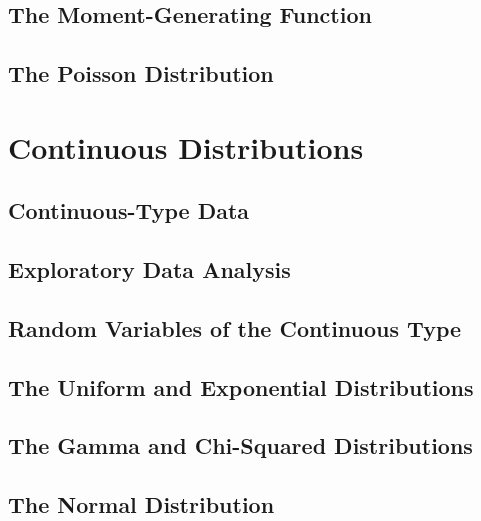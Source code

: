 \documentclass{article}
\begin{document}
\subsection{The Moment-Generating Function}
\subsection{The Poisson Distribution}
\section{Continuous Distributions}
\subsection{Continuous-Type Data}
\subsection{Exploratory Data Analysis}
\subsection{Random Variables of the Continuous Type}
\subsection{The Uniform and Exponential Distributions}
\subsection{The Gamma and Chi-Squared Distributions}
\subsection{The Normal Distribution}
\end{document}
